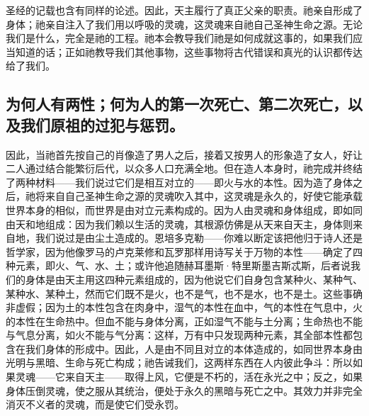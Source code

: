 \par

圣经的记载也含有同样的论述。因此，天主履行了真正父亲的职责。祂亲自形成了身体；祂亲自注入了我们用以呼吸的灵魂，这灵魂来自祂自己圣神生命之源。无论我们是什么，完全是祂的工程。祂本会教导我们祂是如何成就这事的，如果我们应当知道的话；正如祂教导我们其他事物，这些事物将古代错误和真光的认识都传达给了我们。\par


\subsection{为何人有两性；何为人的第一次死亡、第二次死亡，以及我们原祖的过犯与惩罚。}

因此，当祂首先按自己的肖像造了男人之后，接着又按男人的形象造了女人，好让二人通过结合能繁衍后代，以众多人口充满全地。但在造人本身时，祂完成并终结了两种材料——我们说过它们是相互对立的——即火与水的本性。因为造了身体之后，祂将来自自己圣神生命之源的灵魂吹入其中，这灵魂是永久的，好使它能承载世界本身的相似，而世界是由对立元素构成的。因为人由灵魂和身体组成，即如同由天和地组成：因为我们赖以生活的灵魂，其根源仿佛是从天来自天主，身体则来自地，我们说过是由尘土造成的。恩培多克勒——你难以断定该把他归于诗人还是哲学家，因为他像罗马的卢克莱修和瓦罗那样用诗写关于万物的本性——确定了四种元素，即火、气、水、土；或许他追随赫耳墨斯·特里斯墨吉斯忒斯，后者说我们的身体是由天主用这四种元素组成的，因为他说它们自身包含某种火、某种气、某种水、某种土，然而它们既不是火，也不是气，也不是水，也不是土。这些事确非虚假；因为土的本性包含在肉身中，湿气的本性在血中，气的本性在气息中，火的本性在生命热中。但血不能与身体分离，正如湿气不能与土分离；生命热也不能与气息分离，如火不能与气分离：这样，万有中只发现两种元素，其全部本性都包含在我们身体的形成中。因此，人是由不同且对立的本体造成的，如同世界本身由光明与黑暗、生命与死亡构成；祂告诫我们，这两样东西在人内彼此争斗：所以如果灵魂——它来自天主——取得上风，它便是不朽的，活在永光之中；反之，如果身体压倒灵魂，使之服从其统治，便处于永久的黑暗与死亡之中。其效力并非完全消灭不义者的灵魂，而是使它们受永罚。\par


